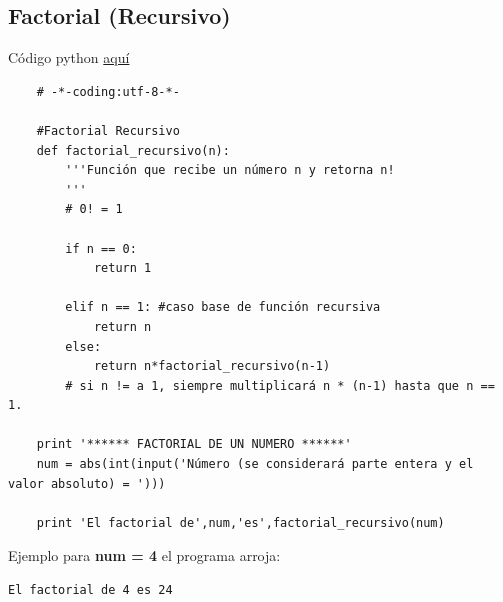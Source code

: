 \documentclass{article}
\begin{document}
\subsection{Factorial (Recursivo)}
Código python \href{https://github.com/joescalona/Programacion-Astronomica/blob/master/Tarea\%205/problema2_recursion.py}{aquí}
    \begin{verbatim}
    # -*-coding:utf-8-*-

    #Factorial Recursivo
    def factorial_recursivo(n):
    	'''Función que recibe un número n y retorna n!
    	''' 
    	# 0! = 1
    
    	if n == 0:
    		return 1
    	
    	elif n == 1: #caso base de función recursiva
    		return n
    	else:
    		return n*factorial_recursivo(n-1)
    	# si n != a 1, siempre multiplicará n * (n-1) hasta que n == 1. 

    print '****** FACTORIAL DE UN NUMERO ******'
    num = abs(int(input('Número (se considerará parte entera y el valor absoluto) = ')))
    
    print 'El factorial de',num,'es',factorial_recursivo(num)

    \end{verbatim}
    
    \noindent
    Ejemplo para \textbf{num = 4} el programa arroja:
    \begin{lstlisting}[style=C,numbers=none]
    El factorial de 4 es 24
    \end{lstlisting}
\end{document}
